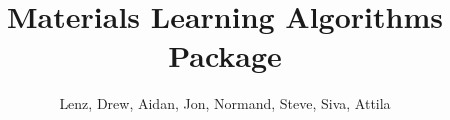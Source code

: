 \documentclass[preprint,12pt]{elsarticle}
\begin{document}
\begin{frontmatter}



\title{Materials Learning Algorithms Package}


\author{Lenz, Drew, Aidan, Jon, Normand, Steve, Siva, Attila}


\begin{abstract}

\end{abstract}



\begin{keyword}



\end{keyword}

\end{frontmatter}
\end{document}
